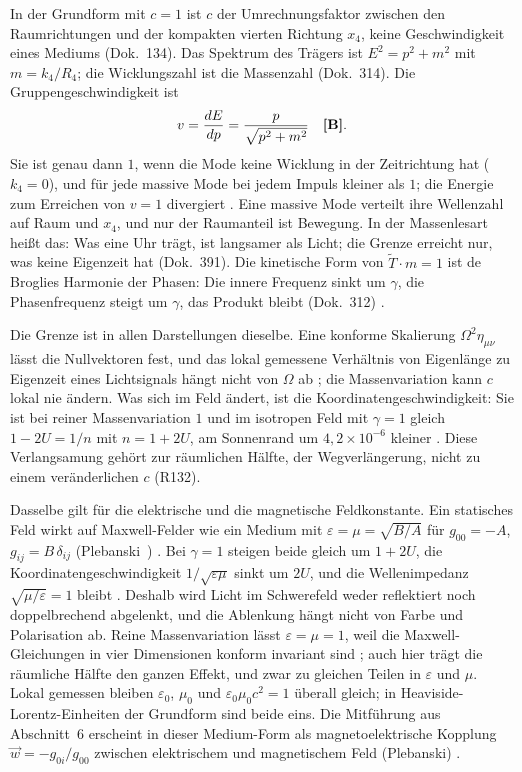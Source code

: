 In der Grundform mit $c=1$ ist $c$ der Umrechnungsfaktor zwischen den Raumrichtungen und der
kompakten vierten Richtung $x_4$, keine Geschwindigkeit eines Mediums (Dok.~134). Das Spektrum des
Trägers ist $E^2=p^2+m^2$ mit $m=k_4/R_4$; die Wicklungszahl ist die Massenzahl (Dok.~314). Die
Gruppengeschwindigkeit ist
\begin{equation}
v=\frac{dE}{dp}=\frac{p}{\sqrt{p^2+m^2}}\quad\textbf{[B]}.
\end{equation}
Sie ist genau dann $1$, wenn die Mode keine Wicklung in der Zeitrichtung hat ($k_4=0$), und für jede
massive Mode bei jedem Impuls kleiner als $1$; die Energie zum Erreichen von $v=1$ divergiert \BM.
Eine massive Mode verteilt ihre Wellenzahl auf Raum und $x_4$, und nur der Raumanteil ist Bewegung.
In der Massenlesart heißt das: Was eine Uhr trägt, ist langsamer als Licht; die Grenze erreicht nur,
was keine Eigenzeit hat (Dok.~391). Die kinetische Form von $\tilde T\cdot m=1$ ist de Broglies
Harmonie der Phasen: Die innere Frequenz sinkt um $\gamma$, die Phasenfrequenz steigt um $\gamma$, das
Produkt bleibt (Dok.~312) \BM.

Die Grenze ist in allen Darstellungen dieselbe. Eine konforme Skalierung $\Omega^2\eta_{\mu\nu}$ lässt
die Nullvektoren fest, und das lokal gemessene Verhältnis von Eigenlänge zu Eigenzeit eines
Lichtsignals hängt nicht von $\Omega$ ab \BM; die Massenvariation kann $c$ lokal nie ändern. Was sich
im Feld ändert, ist die Koordinatengeschwindigkeit: Sie ist bei reiner Massenvariation $1$ und im
isotropen Feld mit $\gamma=1$ gleich $1-2U=1/n$ mit $n=1+2U$, am Sonnenrand um $4{,}2\times10^{-6}$
kleiner \KM. Diese Verlangsamung gehört zur räumlichen Hälfte, der Wegverlängerung, nicht zu einem
veränderlichen $c$ (R132).

Dasselbe gilt für die elektrische und die magnetische Feldkonstante. Ein statisches Feld wirkt auf
Maxwell-Felder wie ein Medium mit $\varepsilon=\mu=\sqrt{B/A}$ für $g_{00}=-A$, $g_{ij}=B\,\delta_{ij}$
(Plebanski~\cite{Plebanski1960}) \QM. Bei $\gamma=1$ steigen beide gleich um $1+2U$, die
Koordinatengeschwindigkeit $1/\sqrt{\varepsilon\mu}$ sinkt um $2U$, und die Wellenimpedanz
$\sqrt{\mu/\varepsilon}=1$ bleibt \BM. Deshalb wird Licht im Schwerefeld weder reflektiert noch
doppelbrechend abgelenkt, und die Ablenkung hängt nicht von Farbe und Polarisation ab. Reine
Massenvariation lässt $\varepsilon=\mu=1$, weil die Maxwell-Gleichungen in vier Dimensionen konform
invariant sind \BM; auch hier trägt die räumliche Hälfte den ganzen Effekt, und zwar zu gleichen
Teilen in $\varepsilon$ und $\mu$. Lokal gemessen bleiben $\varepsilon_0$, $\mu_0$ und
$\varepsilon_0\mu_0c^2=1$ überall gleich; in Heaviside-Lorentz-Einheiten der Grundform sind beide eins.
Die Mitführung aus Abschnitt~6 erscheint in dieser Medium-Form als magnetoelektrische Kopplung
$\vec w=-g_{0i}/g_{00}$ zwischen elektrischem und magnetischem Feld (Plebanski) \QM.

